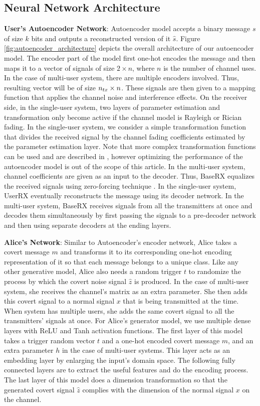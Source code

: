 \subsection{Neural Network Architecture}
\textbf{User's Autoencoder Network}: Autoencoder model accepts a binary message \(s\) of size \(k\) bits and outputs a reconstructed version of it \(\hat{s}\). Figure \ref{fig:autoencoder_architecture} depicts the overall architecture of our autoencoder model. The encoder part of the model first one-hot encodes the message and then maps it to a vector of signals of size \(2 \times n\), where \(n\) is the number of channel uses. In the case of multi-user system, there are multiple encoders involved. Thus, resulting vector will be of size \(n_{tx} \time 2 \times n\). These signals are then given to a mapping function that applies the channel noise and interference effects. On the receiver side, in the single-user system, two layers of parameter estimation and transformation only become active if the channel model is Rayleigh or Rician fading. In the single-user system, we consider a simple transformation function that divides the received signal by the channel fading coefficients estimated by the parameter estimation layer. Note that more complex transformation functions can be used and are described in \cite{o2017introduction}, however optimizing the performance of the autoencoder model is out of the scope of this article. In the multi-user system, channel coefficients are given as an input to the decoder. Thus, BaseRX equalizes the received signals using zero-forcing technique \cite{garg2010wireless}. In the single-user system, UserRX eventually reconstructs the message using its decoder network. In the multi-user system, BaseRX receives signals from all the transmitters at once and decodes them simultaneously by first passing the signals to a pre-decoder network and then using separate decoders at the ending layers.


\textbf{Alice's Network}: Similar to Autoencoder's encoder network, Alice takes a covert message \(m\) and transforms it to its corresponding one-hot encoding representation of it so that each message belongs to a unique class. Like any other generative model, Alice also needs a random trigger \(t\) to randomize the process by which the covert noise signal \(\hat{z}\) is produced. In the case of multi-user system, she receives the channel's matrix as an extra parameter. She then adds this covert signal to a normal signal \(x\) that is being transmitted at the time. When system has multiple users, she adds the same covert signal to all the transmitters' signals at once. For Alice's generator model, we use multiple dense layers with ReLU and Tanh activation functions. The first layer of this model takes a trigger random vector \(t\) and a one-hot encoded covert message \(m\), and an extra parameter \(h\) in the case of multi-user systems. This layer acts as an embedding layer by enlarging the input's domain space. The following fully connected layers are to extract the useful features and do the encoding process. The last layer of this model does a dimension transformation so that the generated covert signal \(\hat{z}\) complies with the dimension of the normal signal \(x\) on the channel. 


